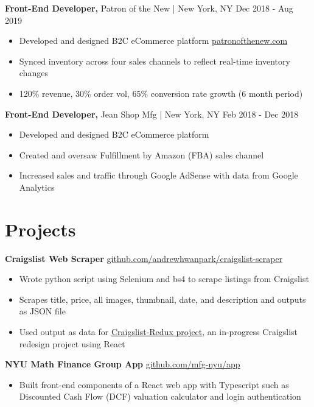 \documentclass[margin]{res}
\begin{document}
\begin{resume}
 
 
{\bf Front-End Developer,} Patron of the New | New York, NY \hfill  Dec 2018 - Aug 2019
\begin{itemize} \itemsep -2pt %
\item Developed and designed B2C eCommerce platform \null\hfill \href{https://patronofthenew.com}{patronofthenew.com}
\item Synced inventory across four sales channels to reflect real-time inventory changes
\item 120\% revenue, 30\% order vol, 65\% conversion rate growth (6 month period)
\end{itemize}

{\bf Front-End Developer,} Jean Shop Mfg | New York, NY \hfill
Feb 2018 - Dec 2018                
                \begin{itemize} \itemsep -2pt
                 \item Developed and designed B2C eCommerce platform
                
                 \item Created and oversaw Fulfillment by Amazon (FBA) sales channel
                 \item Increased sales and traffic through Google AdSense with data from Google Analytics

		 \end{itemize}

\section{Projects} 
               {\bf Craigslist Web Scraper}    \hfill \href{https://github.com/andrewhwanpark/craigslist-scraper}{github.com/andrewhwanpark/craigslist-scraper}
                \begin{itemize} \itemsep -2pt
              \item Wrote python script using Selenium and bs4 to scrape listings from Craigslist
                 
                \item  Scrapes title, price, all images, thumbnail, date, and description and outputs as JSON file
                \item Used output as data for \href{https://github.com/andrewhwanpark/craigslist-redux}{Craigslist-Redux project}, an in-progress Craigslist redesign project using React

		 \end{itemize}
		 {\bf NYU Math Finance Group App}    \hfill\href{https://github.com/mfg-nyu/app}{github.com/mfg-nyu/app}
		 \begin{itemize} \itemsep -2pt
		 \item Built front-end components of a React web app with Typescript such as Discounted Cash Flow (DCF) valuation calculator and login authentication
		 \end{itemize}


\end{resume}
\end{document}
